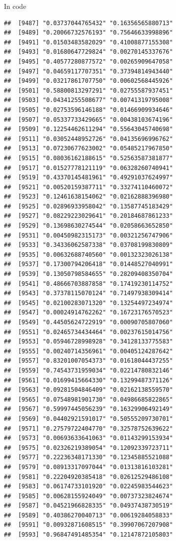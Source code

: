\documentclass[ignorenonframetext,]{beamer}
\begin{document}
\begin{frame}[fragile]{In code}
\begin{verbatim}
##  [9487] "0.03737044765432" "0.16356565880713"
##  [9489] "0.20066732576193" "0.75646633998896"
##  [9491] "0.01503483582029" "0.41008877155308"
##  [9493] "0.01680647729824" "0.00270145337676"
##  [9495] "0.40577280877572" "0.00265909647058"
##  [9497] "0.04659117707351" "0.37394814943440"
##  [9499] "0.03217861707750" "0.00602568445926"
##  [9501] "0.58800813297291" "0.02755587937451"
##  [9503] "0.04341255508677" "0.00741319795008"
##  [9505] "0.02753596146188" "0.01466909934646"
##  [9507] "0.05337733429665" "0.00438103674196"
##  [9509] "0.12254462611294" "0.55643045740698"
##  [9511] "0.03052448952726" "0.04135696996762"
##  [9513] "0.07230677623002" "0.05485217967850"
##  [9515] "0.08036162188615" "0.52563587381877"
##  [9517] "0.01527778121119" "0.06328260740941"
##  [9519] "0.43370145481961" "0.49291037624997"
##  [9521] "0.00520159387711" "0.33274110460072"
##  [9523] "0.12461638154062" "0.02162888396980"
##  [9525] "0.02896933958042" "0.13587745183429"
##  [9527] "0.08229223029641" "0.20184687861233"
##  [9529] "0.13698630274544" "0.02058663652850"
##  [9531] "0.00450982315173" "0.00321256747906"
##  [9533] "0.34336062587338" "0.03708199830809"
##  [9535] "0.00632688740560" "0.00132323026138"
##  [9537] "0.17300794206418" "0.01448527040991"
##  [9539] "0.13050798584655" "0.28209408350704"
##  [9541] "0.48666703887858" "0.17419230114752"
##  [9543] "0.37378115070124" "0.71497938309414"
##  [9545] "0.02100283071320" "0.13254497234974"
##  [9547] "0.00024914762262" "0.16723176570523"
##  [9549] "0.44505624722919" "0.00090705807060"
##  [9551] "0.02465734434464" "0.00237615014756"
##  [9553] "0.05946728998928" "0.34128133775583"
##  [9555] "0.00240714356961" "0.00405124287642"
##  [9557] "0.83201007054373" "0.01618044437255"
##  [9559] "0.74543731959034" "0.02214780832146"
##  [9561] "0.01699415664330" "0.13299487371126"
##  [9563] "0.09281504846409" "0.02162138559570"
##  [9565] "0.07548981901730" "0.04986685822865"
##  [9567] "0.59997445056239" "0.16329906492149"
##  [9569] "0.04402921591017" "0.50555209730701"
##  [9571] "0.27579722404770" "0.32578752639622"
##  [9573] "0.00693633641063" "0.01143299153934"
##  [9575] "0.02326219389054" "0.12092339723711"
##  [9577] "0.22236348171330" "0.12345885521088"
##  [9579] "0.08913317097044" "0.01313816103281"
##  [9581] "0.22204920385418" "0.02612529486108"
##  [9583] "0.06174733101920" "0.02245983544623"
##  [9585] "0.00628155924049" "0.00737323824674"
##  [9587] "0.04521966828335" "0.04937438730519"
##  [9589] "0.40386270040713" "0.00619284058833"
##  [9591] "0.00932871608515" "0.39907067207908"
##  [9593] "0.96847491485354" "0.12147872105803"

\end{verbatim}
\end{frame}
\end{document}

